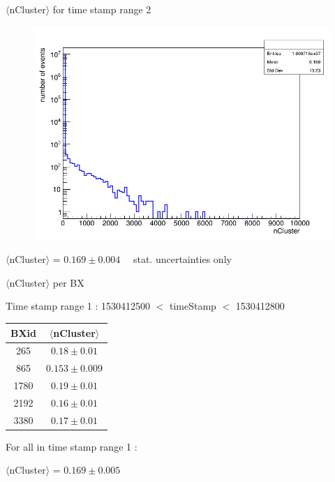 \documentclass{beamer}
\begin{document}
	\begin{frame}
		\begin{block}{$\langle$nCluster$\rangle$ for time stamp range 2}
			\begin{figure}[H!]
				\begin{center}
					\includegraphics[scale=0.25]{nCluster(1530427080<timeStamp<1530427440).png}
				\end{center}
			\end{figure}
		\begin{center}
				$\langle$nCluster$\rangle$ = $0.169 \pm 0.004 \quad$ stat. uncertainties only
		\end{center}
		\end{block}
	\end{frame}
	
	\begin{frame}
		\begin{block}{$\langle$nCluster$\rangle$ per BX}
			\begin{center}
				Time stamp range 1 : 1530412500 $<$ timeStamp $<$ 1530412800
				\newline
				\newline
				\begin{tabular}{|c|c|}
					\hline
					BXid  & $\langle$nCluster$\rangle$ \\
					\hline
					265 & $0.18 \pm 0.01$ \\
					865 & $0.153 \pm 0.009$ \\
					1780 & $0.19 \pm 0.01$ \\
					2192 & $0.16 \pm 0.01$\\
					3380 & $0.17 \pm 0.01$\\
					\hline
				\end{tabular}
			\end{center}
		For all in time stamp range 1 :\begin{center}
		$\langle$nCluster$\rangle$ = $0.169 \pm 0.005$
		\end{center}
		\end{block}
	\end{frame}
	
\end{document}
